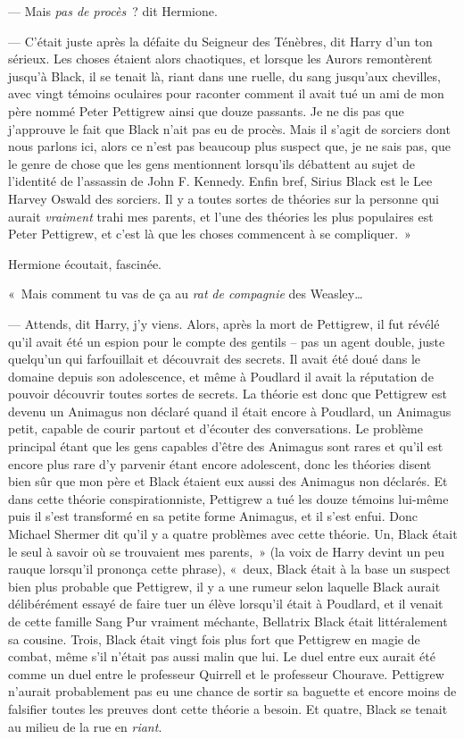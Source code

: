 --- Mais \emph{pas de procès}~? dit Hermione.

--- C'était juste après la défaite du Seigneur des Ténèbres, dit Harry d'un ton sérieux. Les choses étaient alors chaotiques, et lorsque les Aurors remontèrent jusqu'à Black, il se tenait là, riant dans une ruelle, du sang jusqu'aux chevilles, avec vingt témoins oculaires pour raconter comment il avait tué un ami de mon père nommé Peter Pettigrew ainsi que douze passants. Je ne dis pas que j'approuve le fait que Black n'ait pas eu de procès. Mais il s'agit de sorciers dont nous parlons ici, alors ce n'est pas beaucoup plus suspect que, je ne sais pas, que le genre de chose que les gens mentionnent lorsqu'ils débattent au sujet de l'identité de l'assassin de John F. Kennedy. Enfin bref, Sirius Black est le Lee Harvey Oswald des sorciers. Il y a toutes sortes de théories sur la personne qui aurait \emph{vraiment} trahi mes parents, et l'une des théories les plus populaires est Peter Pettigrew, et c'est là que les choses commencent à se compliquer.~»

Hermione écoutait, fascinée.

«~Mais comment tu vas de ça au \emph{rat} \emph{de compagnie} des Weasley…

--- Attends, dit Harry, j'y viens. Alors, après la mort de Pettigrew, il fut révélé qu'il avait été un espion pour le compte des gentils -- pas un agent double, juste quelqu'un qui farfouillait et découvrait des secrets. Il avait été doué dans le domaine depuis son adolescence, et même à Poudlard il avait la réputation de pouvoir découvrir toutes sortes de secrets. La théorie est donc que Pettigrew est devenu un Animagus non déclaré quand il était encore à Poudlard, un Animagus petit, capable de courir partout et d'écouter des conversations. Le problème principal étant que les gens capables d'être des Animagus sont rares et qu'il est encore plus rare d'y parvenir étant encore adolescent, donc les théories disent bien sûr que mon père et Black étaient eux aussi des Animagus non déclarés. Et dans cette théorie conspirationniste, Pettigrew a tué les douze témoins lui-même puis il s'est transformé en sa petite forme Animagus, et il s'est enfui. Donc Michael Shermer dit qu'il y a quatre problèmes avec cette théorie. Un, Black était le seul à savoir où se trouvaient mes parents,~» (la voix de Harry devint un peu rauque lorsqu'il prononça cette phrase), «~deux, Black était à la base un suspect bien plus probable que Pettigrew, il y a une rumeur selon laquelle Black aurait délibérément essayé de faire tuer un élève lorsqu'il était à Poudlard, et il venait de cette famille Sang Pur vraiment méchante, Bellatrix Black était littéralement sa cousine. Trois, Black était vingt fois plus fort que Pettigrew en magie de combat, même s'il n'était pas aussi malin que lui. Le duel entre eux aurait été comme un duel entre le professeur Quirrell et le professeur Chourave. Pettigrew n'aurait probablement pas eu une chance de sortir sa baguette et encore moins de falsifier toutes les preuves dont cette théorie a besoin. Et quatre, Black se tenait au milieu de la rue en \emph{riant}.

